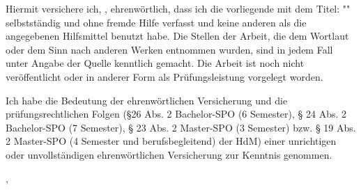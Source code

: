 \thispagestyle{empty}
\noindent
Hiermit versichere ich, \getAuthor{}, ehrenwörtlich, dass ich die vorliegende \getDoctype{} mit dem Titel: "\getTitle{}" selbstständig 
und ohne fremde Hilfe verfasst und keine anderen als die angegebenen Hilfsmittel benutzt habe. Die Stellen der Arbeit, die dem Wortlaut 
oder dem Sinn nach anderen Werken entnommen wurden, sind in jedem Fall unter Angabe der Quelle kenntlich gemacht. Die Arbeit ist noch nicht 
veröffentlicht oder in anderer Form als Prüfungsleistung vorgelegt worden.

\vspace*{5mm}
\noindent
Ich habe die Bedeutung der ehrenwörtlichen Versicherung und die prüfungsrechtlichen Folgen 
(§26 Abs. 2 Bachelor-SPO (6 Semester), § 24 Abs. 2 Bachelor-SPO (7 Semester), § 23 Abs. 2 Master-SPO (3 Semester) bzw. § 19 Abs. 2 Master-SPO (4 Semester und berufsbegleitend) 
der HdM) einer unrichtigen oder unvollständigen ehrenwörtlichen Versicherung zur Kenntnis genommen.

\vspace{15mm}
\noindent
\getSubmissionLocation{}, \getSubmissionDate{} \hspace{50mm} \getAuthor{}

\cleardoublepage{}
